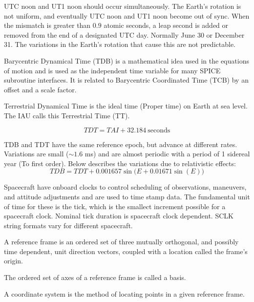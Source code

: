 \documentclass[crop=false,class=book]{standalone}
\begin{document}
\begin{remark}
UTC noon and UT1 noon should occur simultaneously. The Earth's rotation is not uniform, and eventually UTC noon and UT1 noon become out of sync. When the mismatch is greater than $0.9$ atomic seconds, a leap second is added or removed from the end of a designated UTC day. Normally June 30 or December 31. The variations in the Earth's rotation that cause this are not predictable.
\end{remark}
\begin{definition}
Barycentric Dynamical Time (TDB) is a mathematical idea used in the equations of motion and is used as the independent time variable for many SPICE subroutine interfaces. It is related to Barycentric Coordinated Time (TCB) by an offset and a scale factor. 
\end{definition}
\begin{definition}
Terrestrial Dynamical Time is the ideal time (Proper time) on Earth at sea level. The IAU calls this Terrestrial Time (TT).
\end{definition}
\begin{equation}
TDT=TAI+32.184\ \textrm{seconds}
\end{equation}
\begin{remark}
TDB and TDT have the same reference epoch, but advance at different rates. Variations are small ($\sim 1.6$ ms) and are almost periodic with a period of 1 sidereal year (To first order). Below describes the variations due to relativistic effects:
\begin{equation}
TDB=TDT+0.001657\sin\big(E+0.01671\sin(E)\big)
\end{equation}
\end{remark} 
Spacecraft have onboard clocks to control scheduling of observations, maneuvers, and attitude adjustments and are used to time stamp data. The fundamental unit of time for these is the tick, which is the smallect increment possible for a spacecraft clock. Nominal tick duration is spacecraft clock dependent. SCLK string formats vary for different spacecraft. 
\begin{definition}
A reference frame is an ordered set of three mutually orthogonal, and possibly time dependent, unit direction vectors, coupled with a location called the frame's origin.
\end{definition}
\begin{definition}
The ordered set of axes of a reference frame is called a basis.
\end{definition}
\begin{definition}
A coordinate system is the method of locating points in a given reference frame.
\end{definition}
\end{document}
